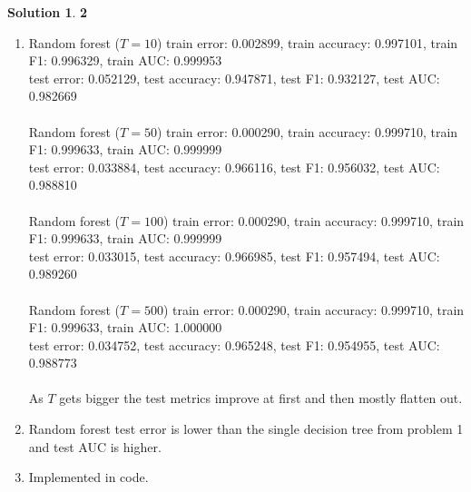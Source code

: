 \documentclass[11pt]{article}
\theoremstyle{definition}
\theoremstyle{nopunct}
\newtheorem*{s}{Solution}
\begin{document}
\begin{s}\textbf{2}
    \begin{enumerate}
        \item Random forest ($T = 10$) train error: 0.002899, train accuracy: 0.997101, train F1: 0.996329, train AUC: 0.999953 \\
            test error: 0.052129, test accuracy: 0.947871, test F1: 0.932127, test AUC: 0.982669 \\
            \bigskip \\
            Random forest ($T = 50$) train error: 0.000290, train accuracy: 0.999710, train F1: 0.999633, train AUC: 0.999999 \\
            test error: 0.033884, test accuracy: 0.966116, test F1: 0.956032, test AUC: 0.988810 \\
            \bigskip \\
            Random forest ($T = 100$) train error: 0.000290, train accuracy: 0.999710, train F1: 0.999633, train AUC: 0.999999 \\
            test error: 0.033015, test accuracy: 0.966985, test F1: 0.957494, test AUC: 0.989260 \\
            \bigskip \\
            Random forest ($T = 500$) train error: 0.000290, train accuracy: 0.999710, train F1: 0.999633, train AUC: 1.000000 \\
            test error: 0.034752, test accuracy: 0.965248, test F1: 0.954955, test AUC: 0.988773 \\
            \bigskip \\
            As $T$ gets bigger the test metrics improve at first and then mostly flatten out.

        \item Random forest test error is lower than the single decision tree from problem 1 and test AUC is higher.

        \item Implemented in code.
    \end{enumerate}
\end{s}

\vspace{10pt}
\end{document}
